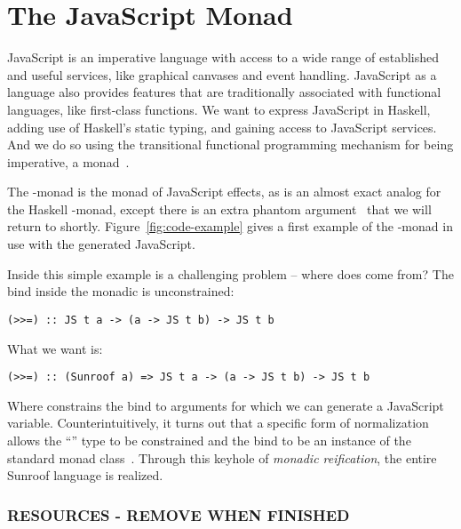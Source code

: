  
\section{The JavaScript Monad}
\label{sec:js-monad}

JavaScript is an imperative language with access to a wide range
of established and useful services, like graphical canvases and event
handling. JavaScript as a language also provides features that are
traditionally associated with functional languages, like first-class 
functions. We want to express JavaScript in Haskell, adding use
of Haskell's static typing, and gaining access to JavaScript services.
And we do so using the transitional functional programming 
mechanism for being imperative, a monad~\cite{Moggi:91:ComputationMonads}.

The \JS-monad is the monad of JavaScript effects, as is an almost
exact analog for the Haskell \IO-monad, except there
is an extra phantom argument~\cite{Leijen:99:Phantom} that we will return
to shortly.  Figure~\ref{fig:code-example} gives a first example
of the \JS-monad in use with the generated JavaScript.

Inside this simple example is a challenging problem -- where does
 come from? The bind inside the monadic  is
unconstrained:
\begin{verbatim}
(>>=) :: JS t a -> (a -> JS t b) -> JS t b
\end{verbatim}
What we want is:
\begin{verbatim}
(>>=) :: (Sunroof a) => JS t a -> (a -> JS t b) -> JS t b
\end{verbatim}
Where  constrains the bind to
arguments for which we can generate a JavaScript variable.
Counterintuitively, 
it turns out that a specific form of normalization allows 
the ``'' type to be constrained and the bind to 
be an instance of the standard monad class~\cite{Sculthorpe:13:ConstrainedMonads}.
Through this keyhole of {\em monadic reification\/},
the entire Sunroof language is realized.

\subsubsection{RESOURCES - REMOVE WHEN FINISHED}

